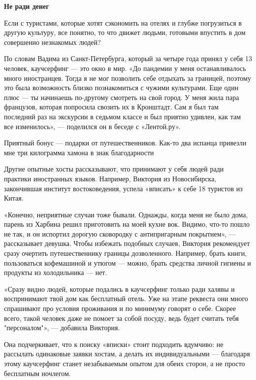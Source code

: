 \textbf{Не ради денег}

Если с туристами, которые хотят сэкономить на отелях и глубже погрузиться в другую культуру, все понятно, то что движет людьми, готовыми впустить в дом совершенно незнакомых людей?

По словам Вадима из Санкт-Петербурга, который за четыре года принял у себя 13 человек, каучсерфинг — это окно в мир. «До пандемии у меня останавливалось много иностранцев. Тогда я не мог позволить себе отдыхать за границей, поэтому это была возможность близко познакомиться с чужими культурами. Еще один плюс — ты начинаешь по-другому смотреть на свой город. У меня жила пара французов, которая попросила свозить их в Кронштадт. Сам я был там последний раз на экскурсии в седьмом классе и был приятно удивлен, как там все изменилось», — поделился он в беседе с «Лентой.ру».

\begin{fancyquotes}
    Приятный бонус — подарки от путешественников. Как-то два испанца привезли мне три килограмма хамона в знак благодарности
\end{fancyquotes}

Другие опытные хосты рассказывают, что принимают у себя людей ради практики иностранных языков. Например, Виктория из Новосибирска, закончившая институт востоковедения, успела «вписать» к себе 18 туристов из Китая.

«Конечно, неприятные случаи тоже бывали. Однажды, когда меня не было дома, парень из Харбина решил приготовить на моей кухне вок. Видимо, что-то пошло не так, и он испортил дорогую сковородку с антипригарным покрытием», — рассказывает девушка. Чтобы избежать подобных случаев, Виктория рекомендует сразу очертить путешественнику границы дозволенного. Например, брать книги, пользоваться кофемашиной и утюгом — можно, брать средства личной гигиены и продукты из холодильника — нет.

«Сразу видно людей, которые подались в каучсерфинг только ради халявы и воспринимают твой дом как бесплатный отель. Уже на этапе реквеста они много спрашивают про условия проживания и по минимуму говорят о себе. Скорее всего, такой человек даже не помоет за собой посуду, ведь будет считать тебя "персоналом"», — добавила Виктория.

Она подчеркивает, что к поиску «вписки» стоит подходить вдумчиво: не рассылать одинаковые заявки хостам, а делать их индивидуальными — благодаря этому каучсерфинг станет незабываемым опытом для обеих сторон, а не просто бесплатным ночлегом.

